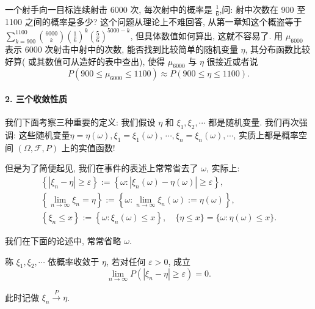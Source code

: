 \begin{example}
    一个射手向一目标连续射击 6000 次, 每次射中的概率是 $\frac{1}{6}$,问: 射中次数在 900 至 1100 之间的概率是多少? 这个问题从理论上不难回答, 从第一章知这个概盗等于 $\sum_{k=900}^{1100} {6000\choose k}\left(\frac{1}{6}\right)^k\left(\frac{5}{6}\right)^{5000-k}$, 但具体数值如何算出, 这就不容易了. 用 $\mu_{6000}$ 表示 6000 次射击中射中的次数, 能否找到比较简单的随机变量 $\eta$, 其分布函数比较好算( 或其数值可从造好的表中查出), 使得 $\mu_{6000}$ 与 $\eta$ 很接近或者说
$$
P\left(900 \leqslant \mu_{6000} \leqslant 1100\right) \approx P(900 \leqslant \eta \leqslant 1100) .
$$
\end{example}

\paragraph{2. 三个收敛性质} 我们下面考察三种重要的定义: 我们假设 $\eta$ 和 $\xi_1, \xi_2, \cdots$ 都是随机变量. 我们再次强调: 这些随机变量$\eta=\eta(\omega), \xi_1=\xi_1(\omega)$, $\cdots, \xi_n=\xi_n(\omega), \cdots$, 实质上都是概率空间 $(\Omega, \mathscr{F}, P)$ 上的实值函数!

但是为了简便起见, 我们在事件的表述上常常省去了 $\omega$, 实际上:
$$
\begin{gathered}
\left\{\left|\xi_n-\eta\right| \geqslant \varepsilon\right\}:=\left\{\omega:\left|\xi_n(\omega)-\eta(\omega)\right| \geqslant \varepsilon\right\}, \\
\left\{\lim _{n \rightarrow \infty} \xi_n=\eta\right\}:=\left\{\omega: \lim _{n \rightarrow \infty} \xi_n(\omega):=\eta(\omega)\right\}, \\
\left\{\xi_n \leqslant x\right\}:=\left\{\omega: \xi_n(\omega) \leqslant x\right\}, \quad\{\eta \leqslant x\}=\{\omega: \eta(\omega) \leqslant x\} .
\end{gathered}
$$

我们在下面的论述中, 常常省略 $\omega$.

\begin{center}
\end{center}

\begin{definition}
    称 $\xi_1, \xi_2, \cdots$ 依概率收敛于 $\eta$, 若对任何 $\varepsilon>0$, 成立
$$
\lim _{n \rightarrow \infty} P\left(\left|\xi_n-\eta\right| \geqslant \varepsilon\right)=0 .
$$

此时记做 $\xi_n \stackrel{P}{\longrightarrow} \eta$.
\end{definition}


